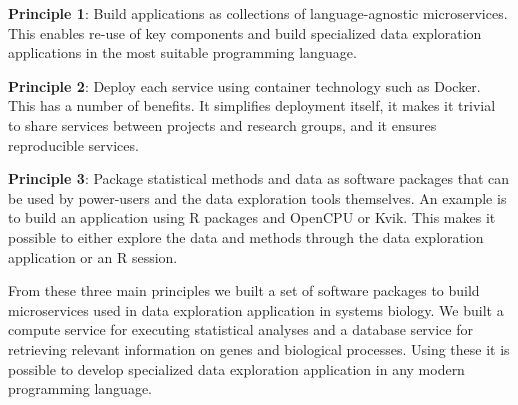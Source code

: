 

\textbf{Principle 1}: Build applications as collections of language-agnostic
microservices. 
This enables re-use of key components and build
specialized data exploration applications in the most suitable programming
language. 

\textbf{Principle 2}: Deploy each service using container technology such as
Docker. This has a number of benefits. It simplifies deployment itself, it makes
it trivial to share services between projects and research groups, and it
ensures reproducible services.

\textbf{Principle 3}: Package statistical methods and data as software packages
that can be used by power-users and the data exploration tools themselves. 
An
example is to build an application using R packages and OpenCPU or Kvik. This
makes it possible to either explore the data and methods through the data
exploration application or an R session. 


From these three main principles we built a set of software packages to build
microservices used in data exploration application in systems biology.
We built
a compute service for executing statistical analyses and a database service for
retrieving relevant information on genes and biological processes.  
Using these
it is possible to develop specialized data exploration application in any modern
programming language.  

